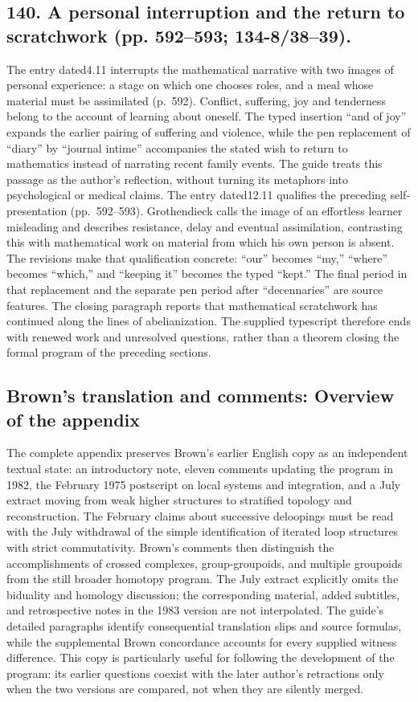 \documentclass[10pt,oneside]{book}
\begin{document}
\subsection*{140. A personal interruption and the return to scratchwork (pp. 592--593; 134-8/38--39).}
The entry dated4.11 interrupts the mathematical narrative with two images of personal experience: a stage on which one chooses roles, and a meal whose material must be assimilated (p.~592). Conflict, suffering, joy and tenderness belong to the account of learning about oneself. The typed insertion ``and of joy'' expands the earlier pairing of suffering and violence, while the pen replacement of ``diary'' by ``journal intime'' accompanies the stated wish to return to mathematics instead of narrating recent family events. The guide treats this passage as the author's reflection, without turning its metaphors into psychological or medical claims. The entry dated12.11 qualifies the preceding self-presentation (pp.~592--593). Grothendieck calls the image of an effortless learner misleading and describes resistance, delay and eventual assimilation, contrasting this with mathematical work on material from which his own person is absent. The revisions make that qualification concrete: ``our'' becomes ``my,'' ``where'' becomes ``which,'' and ``keeping it'' becomes the typed ``kept.'' The final period in that replacement and the separate pen period after ``decennaries'' are source features. The closing paragraph reports that mathematical scratchwork has continued along the lines of abelianization. The supplied typescript therefore ends with renewed work and unresolved questions, rather than a theorem closing the formal program of the preceding sections.

\subsection*{Brown's translation and comments: Overview of the appendix}
The complete appendix preserves Brown's earlier English copy as an independent textual state: an introductory note, eleven comments updating the program in 1982, the February 1975 postscript on local systems and integration, and a July extract moving from weak higher structures to stratified topology and reconstruction. The February claims about successive deloopings must be read with the July withdrawal of the simple identification of iterated loop structures with strict commutativity. Brown's comments then distinguish the accomplishments of crossed complexes, group-groupoids, and multiple groupoids from the still broader homotopy program. The July extract explicitly omits the biduality and homology discussion; the corresponding material, added subtitles, and retrospective notes in the 1983 version are not interpolated. The guide's detailed paragraphs identify consequential translation slips and source formulas, while the supplemental Brown concordance accounts for every supplied witness difference. This copy is particularly useful for following the development of the program: its earlier questions coexist with the later author's retractions only when the two versions are compared, not when they are silently merged.
\end{document}
